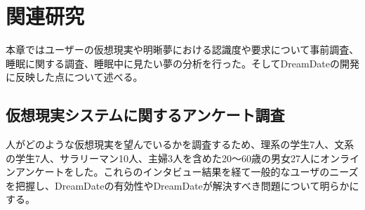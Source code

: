 \chapter{関連研究}
\label{chap:webapi}

本章ではユーザーの仮想現実や明晰夢における認識度や要求について事前調査、睡眠に関する調査、睡眠中に見たい夢の分析を行った。そしてDreamDateの開発に反映した点について述べる。

\section{仮想現実システムに関するアンケート調査}
人がどのような仮想現実を望んでいるかを調査するため、理系の学生7人、文系の学生7人、サラリーマン10人、主婦3人を含めた20〜60歳の男女27人にオンラインアンケートをした。これらのインタビュー結果を経て一般的なユーザのニーズを把握し、DreamDateの有効性やDreamDateが解決すべき問題について明らかにする。





